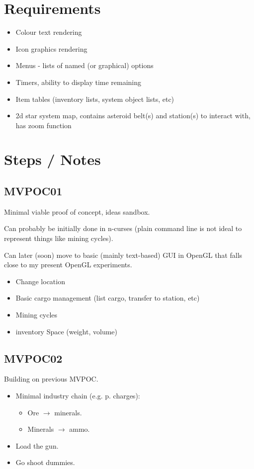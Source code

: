 \documentclass[a4paper,10pt]{article}
\begin{document}
\section{Requirements}
\begin{multicols}{2}

\begin{itemize}
\item Colour text rendering
\item Icon graphics rendering
\item Menus - lists of named (or graphical) options
\item Timers, ability to display time remaining
\item Item tables (inventory lists, system object lists, etc)
\item 2d star system map, contains asteroid belt(s) and station(s) to interact
  with, has zoom function
\end{itemize}
\end{multicols}

\section{Steps / Notes}
\begin{multicols}{2}

\subsection{MVPOC01}
Minimal viable proof of concept, ideas sandbox.

Can probably be initially done in n-curses (plain command line is not ideal to
represent things like mining cycles).

Can later (soon) move to basic (mainly text-based) GUI in OpenGL that falls
close to my present OpenGL experiments.

\begin{itemize}
\item Change location
\item Basic cargo management (list cargo, transfer to station, etc)
\item Mining cycles
\item inventory Space (weight, volume)
\end{itemize}

\subsection{MVPOC02}
Building on previous MVPOC.

\begin{itemize}
\item Minimal industry chain (e.g. p. charges):
  \begin{itemize}
  \item Ore $\rightarrow$ minerals.
  \item Minerals $\rightarrow$ ammo.
  \end{itemize}
\item Load the gun.
\item Go shoot dummies.
\end{itemize}
\end{multicols}
\end{document}
